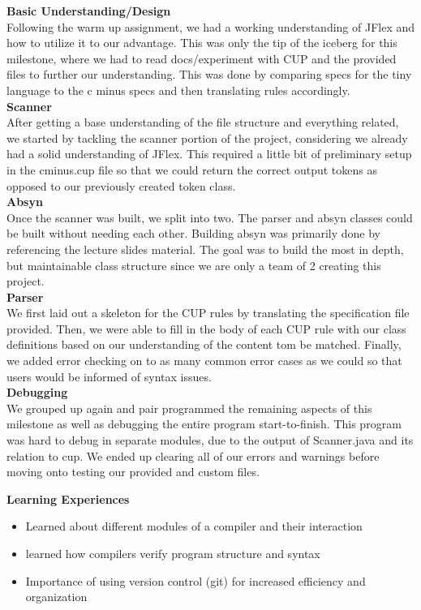 \documentclass[12pt]{extarticle}
\begin{document}
\textbf{Basic Understanding/Design} \\
Following the warm up assignment, we had a working understanding of JFlex and how to utilize it to our advantage. This was only the tip of the iceberg for this milestone, where we had to read docs/experiment with CUP and the provided files to further our understanding. This was done by comparing specs for the tiny language to the c minus specs and then translating rules accordingly. \\
\textbf{Scanner} \\
After getting a base understanding of the file structure and everything related, we started by tackling the scanner portion of the project, considering we already had a solid understanding of JFlex. This required a little bit of preliminary setup in the cminus.cup file so that we could return the correct output tokens as opposed to our previously created token class. \\
\textbf{Absyn} \\
Once the scanner was built, we split into two. The parser and absyn classes could be built without needing each other. Building absyn was primarily done by referencing the lecture slides material. The goal was to build the most in depth, but maintainable class structure since we are only a team of 2 creating this project. \\
\textbf{Parser} \\
We first laid out a skeleton for the CUP rules by translating the specification file provided. Then, we were able to fill in the body of each CUP rule with our class definitions based on our understanding of the content tom be matched. Finally, we added error checking on to as many common error cases as we could so that users would be informed of syntax issues.\\
\textbf{Debugging} \\
We grouped up again and pair programmed the remaining aspects of this milestone as well as debugging the entire program start-to-finish. This program was hard to debug in separate modules, due to the output of Scanner.java and its relation to cup. We ended up clearing all of our errors and warnings before moving onto testing our provided and custom files.

\textbf{Learning Experiences}
\begin{itemize}
    \item Learned about different modules of a compiler and their interaction
    \item learned how compilers verify program structure and syntax
    \item Importance of using version control (git) for increased efficiency and organization
\end{itemize}
\end{document}
